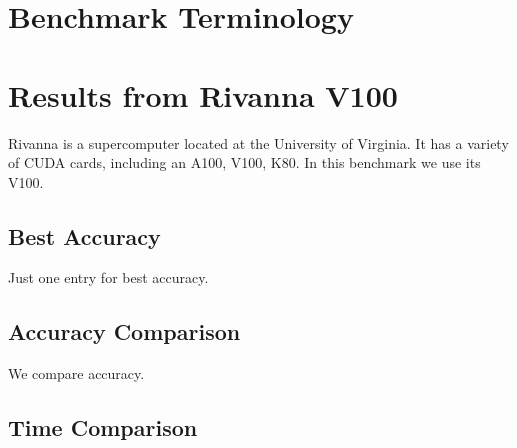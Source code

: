 \documentclass[11pt,twocolumn]{article}
\begin{document}
\section{Benchmark Terminology}

\begin{table}[htb]
\caption{Terminology of benchmark labels}
\label{tab:terminology}
\end{table}

\section{Results from Rivanna V100}

Rivanna is a supercomputer located at the University
of Virginia. It has a variety of CUDA cards, including
an A100, V100, K80. In this benchmark we use its V100.

\subsection{Best Accuracy}

Just one entry for best accuracy.

\subsection{Accuracy Comparison}

We compare accuracy.

\subsection{Time Comparison}
\end{document}
